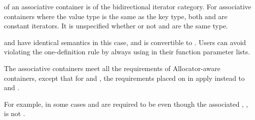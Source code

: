 \documentclass{wg21}
\begin{document}
\pnum
{}
of an associative container is of the bidirectional iterator category.
For associative containers where the value type is the same as the key type, both
and
are constant iterators. It is unspecified whether or not
and
are the same type.
\begin{note}
     and  have identical semantics in this case, and  is convertible to . Users can avoid violating the one-definition rule by always using  in their function parameter lists.
\end{note}

\pnum
The associative containers meet all the requirements of Allocator-aware
containers, except that for
 and , the requirements placed on 
in  apply instead to 
and .
\begin{note}
    For example, in some cases  and 
    are required to be  even though the associated
    , , is not
    .
\end{note}
\end{document}
